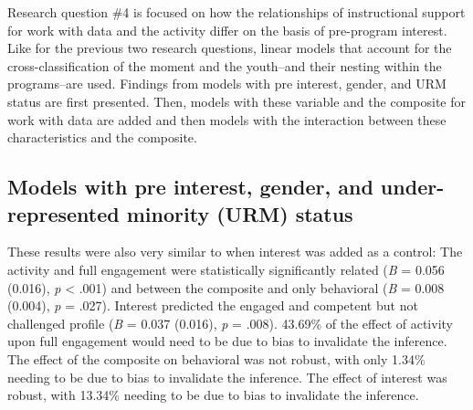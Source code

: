 \documentclass[]{msu-thesis}
\theoremstyle{definition}
\theoremstyle{definition}
\theoremstyle{definition}
\theoremstyle{remark}
\begin{document}
Research question \#4 is focused on how the relationships of
instructional support for work with data and the activity differ on the
basis of pre-program interest. Like for the previous two research
questions, linear models that account for the cross-classification of
the moment and the youth--and their nesting within the programs--are
used. Findings from models with pre interest, gender, and URM status are
first presented. Then, models with these variable and the composite for
work with data are added and then models with the interaction between
these characteristics and the composite.

\subsection{Models with pre interest, gender, and under-represented
minority (URM)
status}\label{models-with-pre-interest-gender-and-under-represented-minority-urm-status}

These results were also very similar to when interest was added as a
control: The activity and full engagement were statistically
significantly related (\emph{B} = 0.056 (0.016), \emph{p} \textless{}
.001) and between the composite and only behavioral (\emph{B} = 0.008
(0.004), \emph{p} = .027). Interest predicted the engaged and competent
but not challenged profile (\emph{B} = 0.037 (0.016), \emph{p} = .008).
43.69\% of the effect of activity upon full engagement would need to be
due to bias to invalidate the inference. The effect of the composite on
behavioral was not robust, with only 1.34\% needing to be due to bias to
invalidate the inference. The effect of interest was robust, with
13.34\% needing to be due to bias to invalidate the inference.
\end{document}
